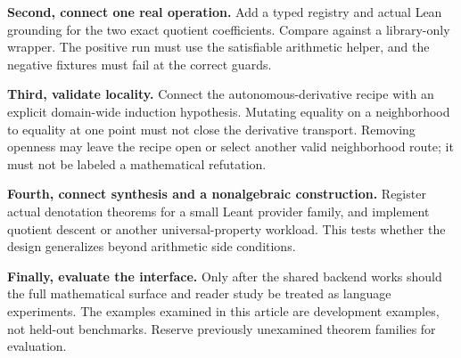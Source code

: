 \documentclass[11pt,a4paper]{article}
\theoremstyle{definition}\newtheorem{definition}[theorem]{Definition}
\theoremstyle{remark}\newtheorem{remark}[theorem]{Remark}
\begin{document}
\textbf{Second, connect one real operation.} Add a typed registry and actual Lean grounding for the two exact quotient coefficients. Compare against a library-only wrapper. The positive run must use the satisfiable arithmetic helper, and the negative fixtures must fail at the correct guards.

\textbf{Third, validate locality.} Connect the autonomous-derivative recipe with an explicit domain-wide induction hypothesis. Mutating equality on a neighborhood to equality at one point must not close the derivative transport. Removing openness may leave the recipe open or select another valid neighborhood route; it must not be labeled a mathematical refutation.

\textbf{Fourth, connect synthesis and a nonalgebraic construction.} Register actual denotation theorems for a small Leant provider family, and implement quotient descent or another universal-property workload. This tests whether the design generalizes beyond arithmetic side conditions.

\textbf{Finally, evaluate the interface.} Only after the shared backend works should the full mathematical surface and reader study be treated as language experiments. The examples examined in this article are development examples, not held-out benchmarks. Reserve previously unexamined theorem families for evaluation.
\end{document}
